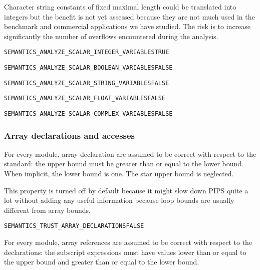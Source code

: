 \documentclass[a4paper]{report}
\newenvironment{PipsProp}{\begin{alltt}}{\end{alltt}}
\begin{document}
Character string constants of fixed maximal length could be translated
into integers but the benefit is not yet assessed because they are not
much used in the benchmark and commercial applications we have studied.
The risk is to increase significantly the number of overflows encountered
during the analysis.

\begin{PipsProp}
SEMANTICS_ANALYZE_SCALAR_INTEGER_VARIABLES TRUE
\end{PipsProp}

\begin{PipsProp}
SEMANTICS_ANALYZE_SCALAR_BOOLEAN_VARIABLES FALSE
\end{PipsProp}

\begin{PipsProp}
SEMANTICS_ANALYZE_SCALAR_STRING_VARIABLES FALSE
\end{PipsProp}

\begin{PipsProp}
SEMANTICS_ANALYZE_SCALAR_FLOAT_VARIABLES FALSE
\end{PipsProp}

\begin{PipsProp}
SEMANTICS_ANALYZE_SCALAR_COMPLEX_VARIABLES FALSE
\end{PipsProp}

\subsubsection{Array declarations and accesses}
\label{subsubsection:array-declarations-and-accesses}

For every module, array declaration are assumed to be correct with respect
to the standard: the upper bound must be greater than or equal to the
lower bound. When implicit, the lower bound is one. The star upper bound
is neglected.

This property is turned off by default because it might slow down PIPS
quite a lot without adding any useful information because loop bounds are
usually different from array bounds.

\begin{PipsProp}
SEMANTICS_TRUST_ARRAY_DECLARATIONS FALSE
\end{PipsProp}

For every module, array references are assumed to be correct with respect
to the declarations: the subscript expressions must have values lower than
or equal to the upper bound and greater than or equal to the lower bound.
\end{document}
